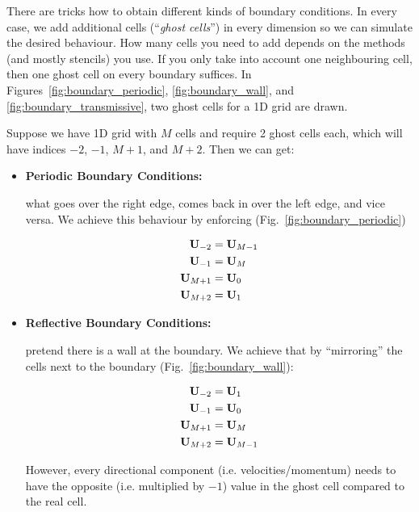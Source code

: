 There are tricks how to obtain different kinds of boundary conditions. In every
case, we add additional cells (``\emph{ghost cells}'') in every dimension so we
can simulate the desired behaviour. How many cells you need to add depends on
the methods (and mostly stencils) you use. If you only take into account one
neighbouring cell, then one ghost cell on every boundary suffices. In
Figures~\ref{fig:boundary_periodic}, \ref{fig:boundary_wall}, and
\ref{fig:boundary_transmissive}, two ghost cells for a 1D grid are drawn.


Suppose we have 1D grid with $M$ cells and require 2 ghost cells each, which
will have indices $-2$, $-1$, $M+1$, and $M+2$. Then we can get:

\begin{itemize}

\item \textbf{Periodic Boundary Conditions:}

what goes over the right edge, comes back in over the left edge, and vice
versa. We achieve this behaviour by enforcing (Fig.~\ref{fig:boundary_periodic})

\begin{align*}
	\mathbf{U}_{-2} &= \mathbf{U}_{M-1} \\
	\mathbf{U}_{-1} &= \mathbf{U}_{M}	\\
	\mathbf{U}_{M+1} &= \mathbf{U}_0 	\\
	\mathbf{U}_{M+2} &= \mathbf{U}_1 	\\
\end{align*}



\item \textbf{Reflective Boundary Conditions:}

pretend there is a wall at the boundary.
We achieve that by ``mirroring'' the cells next to the boundary
(Fig.~\ref{fig:boundary_wall}):

\begin{align*}
	\mathbf{U}_{-2} &= \mathbf{U}_1		\\
	\mathbf{U}_{-1} &= \mathbf{U}_0		\\
	\mathbf{U}_{M+1} &= \mathbf{U}_{M}	\\
	\mathbf{U}_{M+2} &= \mathbf{U}_{M-1}\\
\end{align*}

However, every directional component (i.e. velocities/momentum) needs to
have the opposite (i.e. multiplied by $-1$) value in the ghost cell compared to
the real cell.




\end{itemize}
